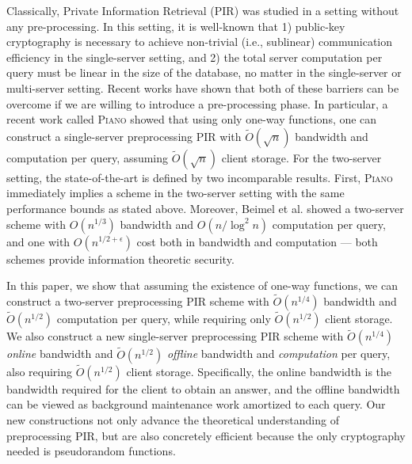 Classically, Private Information Retrieval (PIR) was studied
in a setting without any pre-processing. In this setting, it is well-known
that 1) public-key cryptography is necessary to achieve   
non-trivial (i.e., sublinear) communication efficiency in the single-server setting, 
and 2) the total server computation 
per query must be linear in the size of the database, no matter in the single-server
or multi-server setting.
Recent works have shown that both of these 
barriers can be overcome if we are willing to introduce a pre-processing phase.
In particular, a recent work called \textsc{Piano} showed
that using only one-way functions, one can construct 
a single-server preprocessing PIR with $\widetilde{O}(\sqrt{n})$
bandwidth and computation per query, 
assuming $\widetilde{O}(\sqrt{n})$ client storage.
For the two-server setting, the state-of-the-art is defined
by two incomparable results. First, \textsc{Piano}
immediately implies a scheme in the two-server setting
with the same performance bounds as stated above. 
Moreover, Beimel et al. showed a 
two-server scheme with $O(n^{1/3})$ bandwidth 
and $O(n/\log^2 n)$ computation per query, and one
with $O(n^{1/2 + \epsilon})$
cost both in bandwidth and computation --- both schemes provide
information theoretic security.


In this paper, we show that assuming the existence of one-way functions,
we can construct a two-server preprocessing PIR scheme 
with $\widetilde{O}(n^{1/4})$ bandwidth and $\widetilde{O}(n^{1/2})$
computation per query,  while requiring only 
$\widetilde{O}(n^{1/2})$ client storage.
We also construct 
a new single-server preprocessing PIR scheme with 
$\widetilde{O}(n^{1/4})$ {\it online} bandwidth and $\widetilde{O}(n^{1/2})$
{\it offline} bandwidth and {\it computation} per query, also requiring 
$\widetilde{O}(n^{1/2})$ client storage.
Specifically, the online bandwidth is the bandwidth required for the client
to obtain an answer, and the offline bandwidth can be viewed as %
background maintenance work amortized to each query. 
Our new constructions not only advance the theoretical understanding
of preprocessing PIR, but are also %
concretely efficient because the only cryptography
needed is pseudorandom functions. 





